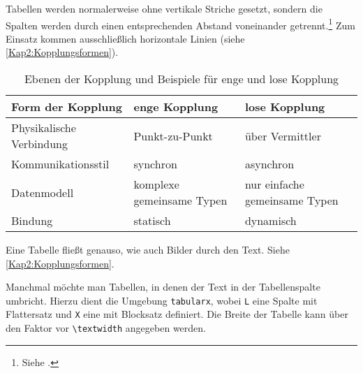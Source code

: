 Tabellen werden normalerweise ohne vertikale Striche gesetzt, sondern die Spalten werden durch einen entsprechenden Abstand voneinander getrennt.\footnote{Siehe \cite[S. 89]{Willberg1999}.} Zum Einsatz kommen ausschließlich horizontale Linien (siehe \autoref{Kap2:Kopplungsformen}).

\begin{table}[h]
  \caption{Ebenen der Kopplung und Beispiele für enge und lose Kopplung}
  \label{Kap2:Kopplungsformen}
  \renewcommand{\arraystretch}{1.2}
  \centering
  \sffamily
  \begin{footnotesize}
    \begin{tabular}{l l l}
    \toprule
    \textbf{Form der Kopplung} & \textbf{enge Kopplung} & \textbf{lose Kopplung}\\
    \midrule
    Physikalische Verbindung	&	Punkt-zu-Punkt	& 	über Vermittler\\
    Kommunikationsstil	&	synchron		&	asynchron\\
    Datenmodell	&	komplexe gemeinsame Typen	&	nur einfache gemeinsame Typen\\
    Bindung	&	statisch		&	dynamisch\\
    \bottomrule
    \end{tabular}
  \end{footnotesize}
  \rmfamily
\end{table}

Eine Tabelle fließt genauso, wie auch Bilder durch den Text. Siehe \autoref{Kap2:Kopplungsformen}.

Manchmal möchte man Tabellen, in denen der Text in der Tabellenspalte umbricht. Hierzu dient die Umgebung \texttt{tabularx}, wobei \texttt{L} eine Spalte mit Flattersatz und \texttt{X} eine mit Blocksatz definiert. Die Breite der Tabelle kann über den Faktor vor \verb+\textwidth+ angegeben werden.

